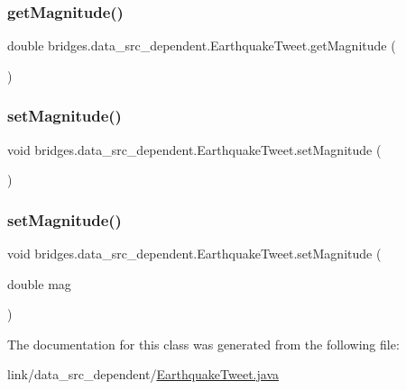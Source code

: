 \subsubsection{\texorpdfstring{get\+Magnitude()}{getMagnitude()}}
{\footnotesize\ttfamily double bridges.\+data\+\_\+src\+\_\+dependent.\+Earthquake\+Tweet.\+get\+Magnitude (\begin{DoxyParamCaption}{ }\end{DoxyParamCaption})}

\hypertarget{classbridges_1_1data__src__dependent_1_1_earthquake_tweet_a49880f314eee430098ca347cd07ff470}{}\label{classbridges_1_1data__src__dependent_1_1_earthquake_tweet_a49880f314eee430098ca347cd07ff470} 
\subsubsection{\texorpdfstring{set\+Magnitude()}{setMagnitude()}\hspace{0.1cm}{\footnotesize\ttfamily [1/2]}}
{\footnotesize\ttfamily void bridges.\+data\+\_\+src\+\_\+dependent.\+Earthquake\+Tweet.\+set\+Magnitude (\begin{DoxyParamCaption}{ }\end{DoxyParamCaption})}

\hypertarget{classbridges_1_1data__src__dependent_1_1_earthquake_tweet_a763d8a261a563e66af95c5a97850ecc0}{}\label{classbridges_1_1data__src__dependent_1_1_earthquake_tweet_a763d8a261a563e66af95c5a97850ecc0} 
\subsubsection{\texorpdfstring{set\+Magnitude()}{setMagnitude()}\hspace{0.1cm}{\footnotesize\ttfamily [2/2]}}
{\footnotesize\ttfamily void bridges.\+data\+\_\+src\+\_\+dependent.\+Earthquake\+Tweet.\+set\+Magnitude (\begin{DoxyParamCaption}\item[{double}]{mag }\end{DoxyParamCaption})}



The documentation for this class was generated from the following file\+:\begin{DoxyCompactItemize}
\item 
link/data\+\_\+src\+\_\+dependent/\hyperlink{_earthquake_tweet_8java}{Earthquake\+Tweet.\+java}\end{DoxyCompactItemize}

